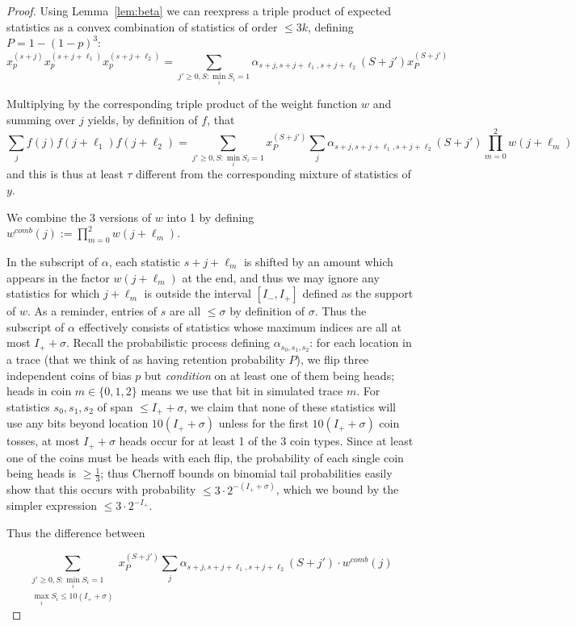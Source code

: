 \documentclass[11pt]{article}
\theoremstyle{plain}
\begin{document}
\begin{proof}


Using Lemma~\ref{lem:beta} we can reexpress a triple product of expected statistics as a convex combination of statistics of order $\leq 3k$, defining $P=1-(1-p)^3$:
\[x^{(s+j)}_p x^{(s+j+\ell_1)}_px^{(s+j+\ell_2)}_p=\sum_{j'\geq 0, S:\min_i S_i=1} \alpha_{s+j,s+j+\ell_1,s+j+\ell_2}(S+j') x_P^{(S+j')}\]

Multiplying by the corresponding triple product of the weight function $w$ and summing over $j$ yields, by definition of $f$, that
\[\sum_j f(j)f(j+\ell_1)f(j+\ell_2)=\sum_{j'\geq 0, S:\min_i S_i=1} x_P^{(S+j')}\sum_j \alpha_{s+j,s+j+\ell_1,s+j+\ell_2}(S+j') \prod_{m=0}^2 w(j+\ell_m)\]
and this is thus at least $\tau$ different from the corresponding mixture of statistics of $y$.

We combine the 3 versions of $w$ into 1 by defining $w^{comb}(j):=\prod_{m=0}^2 w(j+\ell_m)$.

In the subscript of $\alpha$, each statistic $s+j+\ell_m$ is shifted by an amount which appears in the factor $w(j+\ell_m)$ at the end, and thus we may ignore any statistics for which $j+\ell_m$ is outside the interval $[I_-,I_+]$ defined as the support of $w$. As a reminder, entries of $s$ are all $\leq \sigma$ by definition of $\sigma$. Thus the subscript of $\alpha$ effectively consists of statistics whose maximum indices are all at most $I_++\sigma$. Recall the probabilistic process defining $\alpha_{s_0,s_1,s_2}$: for each location in a trace (that we think of as having retention probability $P$), we flip three independent coins of bias $p$ but \emph{condition} on at least one of them being heads; heads in coin $m\in\{0,1,2\}$ means we use that bit in simulated trace $m$. For statistics $s_0,s_1,s_2$ of span $\leq I_++\sigma$, we claim that none of these statistics will use any bits beyond location $10(I_++\sigma)$ unless for the first $10(I_++\sigma)$ coin tosses, at most $I_++\sigma$ heads occur for at least 1 of the 3 coin types. Since at least one of the coins must be heads with each flip, the probability of each single coin being heads is $\geq \frac{1}{3}$; thus Chernoff bounds on binomial tail probabilities easily show that this occurs with probability $\leq 3\cdot 2^{-(I_++\sigma)}$, which we bound by the simpler expression $\leq 3\cdot 2^{-I_+}$.



Thus the difference between

\[\sum_{\substack{j'\geq 0, S:\min_i S_i=1\\\max_i S_i\leq 10(I_++\sigma)}}x_P^{(S+j')}\sum_j \alpha_{s+j,s+j+\ell_1,s+j+\ell_2}(S+j') \cdot w^{comb}(j)\]


\end{proof}
\end{document}
